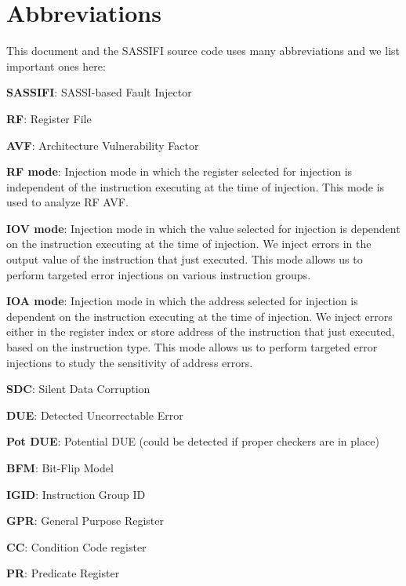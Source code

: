 \section{Abbreviations}

This document and the SASSIFI source code uses many abbreviations and we list important ones here:

{\bf SASSIFI}: SASSI-based Fault Injector 

{\bf RF}: Register File

{\bf AVF}: Architecture Vulnerability Factor 

{\bf RF mode}: Injection mode in which the register selected for injection is
independent of the instruction executing at the time of injection. This mode is
used to analyze RF AVF. 

{\bf IOV mode}: Injection mode in which the value selected for injection is
dependent on the instruction executing at the time of injection. We inject errors 
in the output value of the instruction that just executed. This mode
allows us to perform targeted error injections on various instruction groups.

{\bf IOA mode}: Injection mode in which the address selected for injection is
dependent on the instruction executing at the time of injection. We inject
errors either in the register index or store address of the instruction that
just executed, based on the instruction type. This mode allows us to perform
targeted error injections to study the sensitivity of address errors. 

{\bf SDC}: Silent Data Corruption 

{\bf DUE}: Detected Uncorrectable Error 

{\bf Pot DUE}: Potential DUE (could be detected if proper checkers are in place) 

{\bf BFM}: Bit-Flip Model 

{\bf IGID}: Instruction Group ID 

{\bf GPR}: General Purpose Register

{\bf CC}: Condition Code register

{\bf PR}: Predicate Register 


